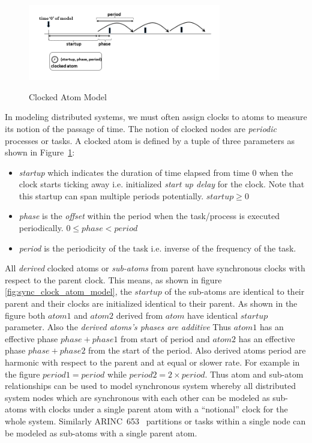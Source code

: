 \begin{figure}[h!]
\centering
\caption{Clocked Atom Model}
 \includegraphics[width=0.75\textwidth]{figures/clocked_atom.png} 
\label{fig:clock_atom_model}
\end{figure}

In modeling distributed systems, we must often assign clocks to atoms to measure its notion of the passage of time. The notion of clocked nodes are \emph{periodic} processes or tasks.  A clocked atom is defined by a tuple of three parameters as shown in Figure~\ref{fig:clock_atom_model}:
\begin{itemize}
\item {\it startup} which indicates the duration of time elapsed from time $0$ when the clock starts ticking away i.e. initialized \emph{start up delay} for the clock. Note that this startup can span multiple periods potentially. $startup \geq 0$
\item {\it phase} is the \emph{offset} within the period when the task/process is executed periodically. $0 \leq phase < period$
\item {\it period} is the periodicity of the task i.e. inverse of the frequency of the task.
\end{itemize}

All \emph{derived} clocked atoms or \emph{sub-atoms} from parent have
synchronous clocks with respect to the parent clock. This means, as shown in
figure \ref{fig:sync_clock_atom_model}, the $startup$ of the sub-atoms are
identical to their parent and their clocks are initialized identical to their
parent.  As shown in the figure both $atom1$ and $atom2$ derived from $atom$
have identical $startup$ parameter. Also the \emph{derived atoms's phases are
additive} Thus $atom1$ has an effective phase $phase+phase1$ from start of
period and $atom2$ has an effective phase $phase+phase2$ from the start of the
period. Also derived atoms period are harmonic with respect to the parent and
at equal or slower rate. For example in the figure $period1 = period$ while
$period2 = 2 \times period$. Thus atom and sub-atom relationships can be used
to model synchronous system whereby all distributed system nodes which are
synchronous with each other can be modeled as sub-atoms with clocks under a
single parent atom with a ``notional'' clock for the whole system. Similarly
ARINC~653~\cite{arinc653} partitions or tasks within a single node can be
modeled as sub-atoms with a single parent atom.


